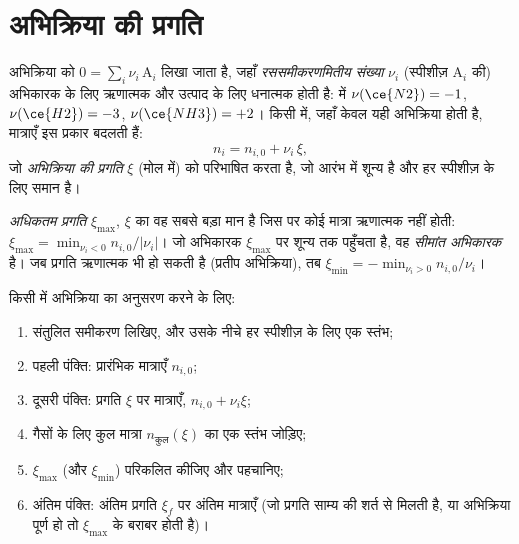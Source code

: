 \section{अभिक्रिया की प्रगति}

\begin{definition}\label{def:b1:extent-q-and-k:extent}
अभिक्रिया को $0 = \sum_i \nu_i\,\mathrm{A}_i$ लिखा जाता है, जहाँ
\emph{रससमीकरणमितीय संख्या} $\nu_i$ (स्पीशीज़
$\mathrm{A}_i$ की) अभिकारक के लिए ऋणात्मक और उत्पाद के लिए धनात्मक होती है:
 में $\nu(\ce{N2}) = -1$, $\nu(\ce{H2}) = -3$,
$\nu(\ce{NH3}) = +2$। किसी  में, जहाँ केवल यही अभिक्रिया
होती है, मात्राएँ इस प्रकार बदलती हैं:
\[
  n_i = n_{i,0} + \nu_i\,\xi ,
\]
जो \emph{अभिक्रिया की प्रगति}
$\xi$ (मोल में) को परिभाषित करता है, जो आरंभ में शून्य है और हर स्पीशीज़ के लिए समान है।
\end{definition}

\begin{definition}\label{def:b1:extent-q-and-k:max-extent}
\emph{अधिकतम प्रगति} $\xi_{\max}$, $\xi$ का वह सबसे बड़ा
मान है जिस पर कोई मात्रा ऋणात्मक नहीं होती: $\xi_{\max} = \min_{\nu_i <
0} n_{i,0}/|\nu_i|$। जो अभिकारक $\xi_{\max}$ पर शून्य तक पहुँचता है, वह
\emph{सीमांत अभिकारक} है। जब प्रगति
ऋणात्मक भी हो सकती है (प्रतीप अभिक्रिया), तब $\xi_{\min} = -\min_{\nu_i > 0}
n_{i,0}/\nu_i$।
\end{definition}

\begin{method}[प्रगति सारणी]\label{met:b1:extent-q-and-k:progress-table}
किसी  में अभिक्रिया का अनुसरण करने के लिए:
\begin{enumerate}
  \item संतुलित समीकरण लिखिए, और उसके नीचे हर स्पीशीज़ के लिए एक स्तंभ;
  \item पहली पंक्ति: प्रारंभिक मात्राएँ $n_{i,0}$;
  \item दूसरी पंक्ति: प्रगति $\xi$ पर मात्राएँ, $n_{i,0} + \nu_i\xi$;
  \item गैसों के लिए कुल मात्रा $n_{\text{कुल}}(\xi)$ का एक स्तंभ जोड़िए;
  \item $\xi_{\max}$ (और $\xi_{\min}$) परिकलित कीजिए और  पहचानिए;
  \item अंतिम पंक्ति: अंतिम प्रगति $\xi_f$ पर अंतिम मात्राएँ (जो प्रगति
        साम्य की शर्त से मिलती है, या अभिक्रिया पूर्ण हो तो
        $\xi_{\max}$ के बराबर होती है)।
\end{enumerate}
\end{method}

